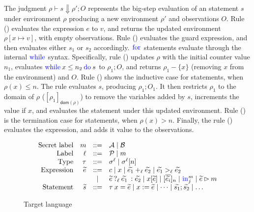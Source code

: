 The judgment $\rho \vdash s \Downarrow \rho'; O$ represents the
big-step evaluation of an statement $s$ under environment $\rho$
producing a new environment $\rho'$ and observations $O$. Rule
({}) evaluates the expression $e$ to $v$, and returns the
updated environment $\rho[x \mapsto v]$, with empty observations. Rule
({}) evaluates the guard expression, and then evaluates
either $s_{1}$ or $s_{2}$ accordingly. $\kw{for}$ statements evaluate
through the internal $\kw{while}$ syntax. Specifically, rule
({}) updates $\rho$ with the initial counter value $n_{1}$,
evaluates $\loops{x}{n_{2}}{s}$ to $\rho_{1}; O$, and returns
$\rho_{1} - \{x\}$ (removing $x$ from the environment) and $O$. Rule
({}) shows the inductive case for 
statements, when $\rho(x) \leq n$. The rule evaluates $s$, producing
$\rho_{1}; O_{1}$. It then restricts $\rho_{1}$ to the domain of
$\rho$ ($[\rho_{1}]_{\mathsf{dom}(\rho)}$) to remove the variables
added by $s$, increments the value if $x$, and evaluates the
 statement under this updated environment. Rule
({}) is the termination case for  statements,
when $\rho(x) > n$. Finally, the rule ({}) evaluates the
expression, and adds it value to the observations.

\newcommand{\lcond}[4]{\ensuremath{{{#2}\:?_{{#1}}\:{#3}\::{#4}}}}

\begin{figure}
  \small
  \[
  \begin{array}{rrcl}
    \ftext{Secret label} & m &::=& \mathcal{A} \mid \mathcal{B}\\
    \ftext{Label} & \ell &::=& \mathcal{P} \mid m\\
    \ftext{Type} & \tau &::=& \sigma^{\ell} \mid \sigma^{\ell}[n]\\
    \ftext{Expression} & \widetilde{e} &::=& c \mid x \mid \widetilde{e_{1}} +_{\ell} \widetilde{e_{2}} \mid \widetilde{e_{1}} >_{\ell} \widetilde{e_{2}} \\
    & & \mid & \lcond{\ell}{{\widetilde{e}}}{{\widetilde{e_{1}}}}{{\widetilde{e_{2}}}} \mid x[\widetilde{e}] \mid [\overline{\widetilde{e_{i}}}]_{n} \mid \kw{in}^{m}_{j} \mid \widetilde{e} \rhd m\\
    \ftext{Statement} & \widetilde{s} &::=& \tau\:x = \widetilde{e} \mid x := \widetilde{e} \mid \dots \mid \widetilde{s_{1}}; \widetilde{s_{2}} \mid \dots\\
  \end{array}
  \]
\caption{Target language}
\label{fig:tgtlang}
\end{figure}

